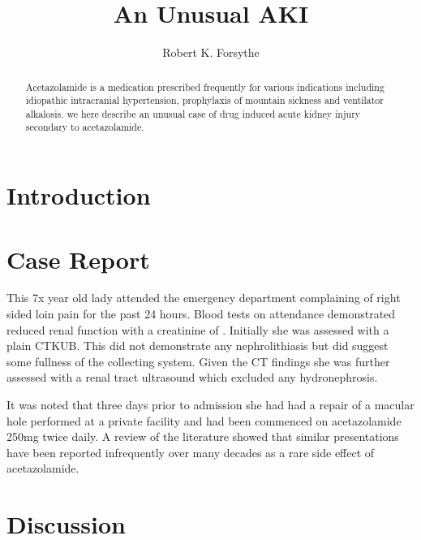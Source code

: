 \documentclass[11pt]{article}
\title{An Unusual AKI}
\author{Robert K. Forsythe}
\begin{document}
\maketitle
\begin{abstract}
	Acetazolamide is a medication prescribed frequently for various indications including idiopathic intracranial hypertension, prophylaxis of mountain sickness and ventilator alkalosis. we here describe an unusual case of drug induced acute kidney injury secondary to acetazolamide. 
\end{abstract}

\section*{Introduction}


		
\section*{Case Report}

This 7x year old lady attended the emergency department complaining of right sided loin pain for the past 24 hours. Blood tests on attendance demonstrated reduced renal function with a creatinine of \todo. Initially she was assessed with a plain CTKUB. This did not demonstrate any nephrolithiasis but did suggest some fullness of the collecting system. Given the CT findings she was further assessed with a renal tract ultrasound which excluded any hydronephrosis. 

It was noted that three days prior to admission she had had a repair of a macular hole performed at a private facility and had been commenced on acetazolamide 250mg twice daily. A review of the literature showed that similar presentations have been reported infrequently over many decades as a rare side effect of acetazolamide. 





\section*{Discussion}
\end{document}
